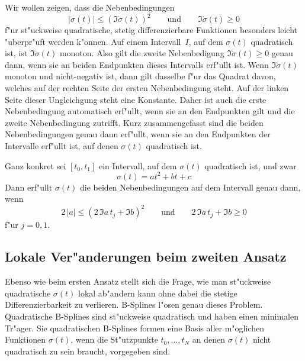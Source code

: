 \documentclass[a4paper]{scrartcl}
\begin{document}
Wir wollen zeigen, dass die Nebenbedingungen 
$$ \lvert\ddot\sigma(t)\rvert \le (\Im\dot\sigma(t))^2 
\qquad \text{und} \qquad
\Im\dot\sigma(t)\ge0 $$
f"ur st"uckweise quadratische, stetig differenzierbare Funktionen besonders leicht "uberpr"uft werden k"onnen. Auf einem Intervall~$I$, auf dem $\sigma(t)$ quadratisch ist, ist $\Im\dot\sigma(t)$ monoton. Also gilt die zweite Nebenbedigung $\Im\dot\sigma(t)\ge0$ genau dann, wenn sie an beiden Endpunkten dieses Intervalls erf"ullt ist. Wenn $\Im\dot\sigma(t)$ monoton und nicht-negativ ist, dann gilt dasselbe f"ur das Quadrat davon, welches auf der rechten Seite der ersten Nebenbedingung steht. Auf der linken Seite dieser Ungleichgung steht eine Konstante. Daher ist auch die erste Nebenbedingung automatisch erf"ullt, wenn sie an den Endpunkten gilt und die zweite Nebenbedingung zutrifft. Kurz zusammengefasst sind die beiden Nebenbedingungen genau dann erf"ullt, wenn sie an den Endpunkten der Intervalle erf"ullt ist, auf denen $\sigma(t)$ quadratisch ist.

Ganz konkret sei $[t_0,t_1]$ ein Intervall, auf dem $\sigma(t)$ quadratisch ist, und zwar
$$ \sigma(t) = at^2 + bt + c $$
Dann erf"ullt $\sigma(t)$ die beiden Nebenbedingungen auf dem Intervall genau dann, wenn 
$$ 2\,\lvert a\rvert \le (2\,\Im a\,t_j + \Im b)^2
\qquad \text{und} \qquad
2\,\Im a\,t_j + \Im b\ge 0 $$
f"ur $j=0,1$. 


\subsection{Lokale Ver"anderungen beim zweiten Ansatz}

Ebenso wie beim ersten Ansatz stellt sich die Frage, wie man st"uckweise quadratische $\sigma(t)$ lokal ab"andern kann ohne dabei die stetige Differenzierbarkeit zu verlieren. B-Splines l"osen genau dieses Problem. Quadratische B-Splines sind st"uckweise quadratisch und haben einen minimalen Tr"ager. Sie quadratischen B-Splines formen eine Basis aller m"oglichen Funktionen $\sigma(t)$, wenn die St"utzpunkte $t_0,\dotsc, t_N$ an denen $\sigma(t)$ nicht quadratisch zu sein braucht, vorgegeben sind. 
\end{document}
